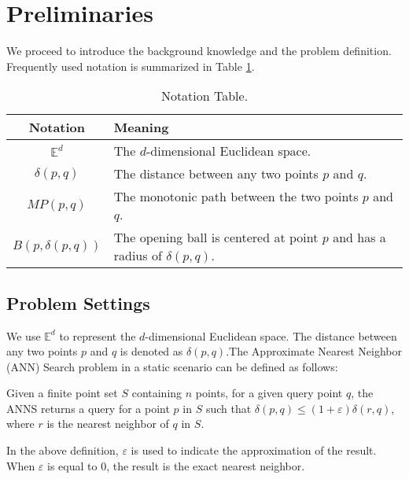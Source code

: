 \section{Preliminaries}\label{sec:preliminaries}

We proceed to introduce the background knowledge and the problem definition. Frequently used notation is summarized in Table \ref{tb:notation}.

\begin{table}[h!]
	\begin{center}
		\caption{Notation Table.}
		\begin{tabular}{c|l} %
			\label{tb:notation}
			\textbf{Notation} & \textbf{Meaning}\\
			\hline
			$\mathbb{E}^d$ & The $d$-dimensional Euclidean space.\\
			$\delta(p,q)$ & The distance between any two points $p$ and $q$.\\
			$MP(p,q)$ & The monotonic path between the two points $p$ and $q$.\\
			$B(p,\delta(p,q))$ & The opening ball is centered at point $p$ and has a radius of $\delta(p,q)$.\\
		\end{tabular}
	\end{center}
\end{table}

\subsection{Problem Settings}
We use $\mathbb{E}^d$ to represent the $d$-dimensional Euclidean space. The distance between any two points $p$ and $q$ is denoted as $\delta(p, q)$.The Approximate Nearest Neighbor (ANN) Search problem in a static scenario can be defined as follows:

\begin{definition}\label{anns}
	Given a finite point set $S$ containing $n$ points, for a given query point $q$, the ANNS returns a query for a point $p$ in $S$ such that $\delta(p,q)\le(1+\varepsilon)\delta(r,q)$, where $r$ is the nearest neighbor of $q$ in $S$.
\end{definition}

In the above definition, $\varepsilon$ is used to indicate the approximation of the result. When $\varepsilon$ is equal to 0, the result is the exact nearest neighbor.

